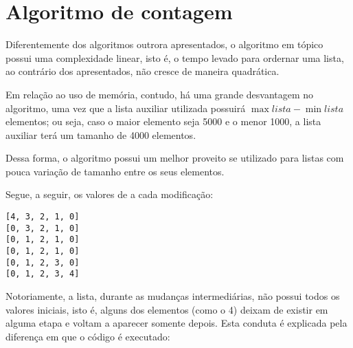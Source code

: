 \section{Algoritmo de contagem}
Diferentemente dos algoritmos outrora apresentados, o algoritmo em tópico possui uma complexidade linear, isto é, o tempo levado para ordernar uma lista, ao contrário dos apresentados, não cresce de maneira quadrática. 

Em relação ao uso de memória, contudo, há uma grande desvantagem no algoritmo, uma vez que a lista auxiliar utilizada possuirá $\max{lista}-\min{lista} $ elementos; ou seja, caso o maior elemento seja 5000 e o menor 1000, a lista auxiliar terá um tamanho de 4000 elementos.

Dessa forma, o algoritmo possui um melhor proveito se utilizado para listas com pouca variação de tamanho entre os seus elementos.

Segue, a seguir, os valores de  a cada modificação:
\begin{lstlisting}
[4, 3, 2, 1, 0]
[0, 3, 2, 1, 0]
[0, 1, 2, 1, 0]
[0, 1, 2, 1, 0]
[0, 1, 2, 3, 0]
[0, 1, 2, 3, 4]
\end{lstlisting}

Notoriamente, a lista, durante as mudanças intermediárias, não possui todos os valores iniciais, isto é, alguns dos elementos (como o 4) deixam de existir em alguma etapa e voltam a aparecer somente depois. Esta conduta é explicada pela diferença em que o código é executado: 
